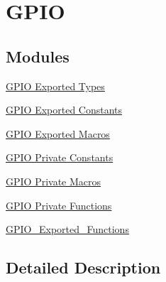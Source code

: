 \hypertarget{group___g_p_i_o}{}\section{G\+P\+IO}
\label{group___g_p_i_o}
\subsection*{Modules}
\begin{DoxyCompactItemize}
\item 
\hyperlink{group___g_p_i_o___exported___types}{G\+P\+I\+O Exported Types}
\item 
\hyperlink{group___g_p_i_o___exported___constants}{G\+P\+I\+O Exported Constants}
\item 
\hyperlink{group___g_p_i_o___exported___macros}{G\+P\+I\+O Exported Macros}
\item 
\hyperlink{group___g_p_i_o___private___constants}{G\+P\+I\+O Private Constants}
\item 
\hyperlink{group___g_p_i_o___private___macros}{G\+P\+I\+O Private Macros}
\item 
\hyperlink{group___g_p_i_o___private___functions}{G\+P\+I\+O Private Functions}
\item 
\hyperlink{group___g_p_i_o___exported___functions}{G\+P\+I\+O\+\_\+\+Exported\+\_\+\+Functions}
\end{DoxyCompactItemize}


\subsection{Detailed Description}

